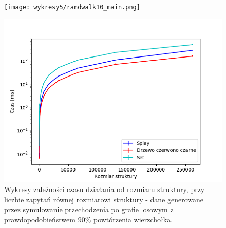 \documentclass[declaration,shortabstract]{iithesis}
\theoremstyle{thm}
\theoremstyle{remark}
\theoremstyle{plain}
\theoremstyle{plain}
\theoremstyle{plain}
\begin{document}
\begin{figure}[H]
\begin{minipage}[b]{.45\textwidth}
\centering
\texttt{[image: wykresy5/randwalk10\_main.png]}
\end{minipage}
\hfill
\begin{minipage}[b]{.45\textwidth}
\centering
\includegraphics[width=1\textwidth]{wykresy3/randwalk10_main.png}
\end{minipage}
\caption{Wykresy zależności czasu działania od rozmiaru struktury, przy liczbie zapytań równej rozmiarowi struktury - dane generowane przez symulowanie przechodzenia po grafie losowym z prawdopodobieństwem  \(90\%\) powtórzenia wierzchołka.}
\end{figure}
\end{document}
